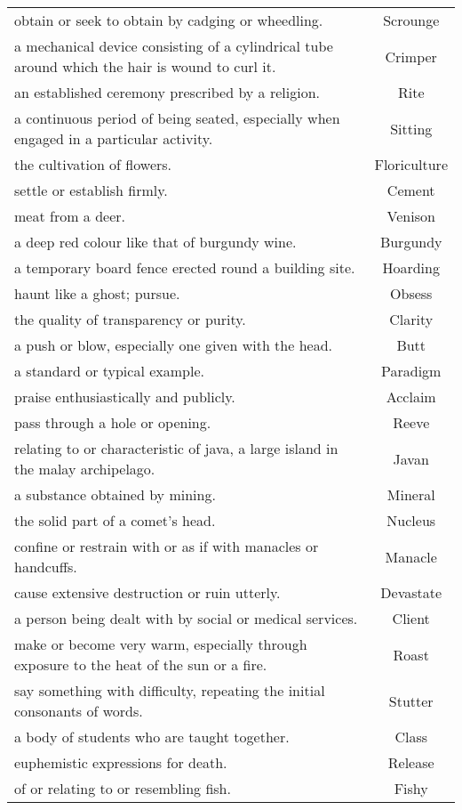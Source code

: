 \documentclass{article}
\begin{document}
\begin{longtable}{p{12cm}c}
obtain or seek to obtain by cadging or wheedling. & Scrounge\\
a mechanical device consisting of a cylindrical tube around which the hair is wound to curl it. & Crimper\\
an established ceremony prescribed by a religion. & Rite\\
a continuous period of being seated, especially when engaged in a particular activity. & Sitting\\
the cultivation of flowers. & Floriculture\\
settle or establish firmly. & Cement\\
meat from a deer. & Venison\\
a deep red colour like that of burgundy wine. & Burgundy\\
a temporary board fence erected round a building site. & Hoarding\\
haunt like a ghost; pursue. & Obsess\\
the quality of transparency or purity. & Clarity\\
a push or blow, especially one given with the head. & Butt\\
a standard or typical example. & Paradigm\\
praise enthusiastically and publicly. & Acclaim\\
pass through a hole or opening. & Reeve\\
relating to or characteristic of java, a large island in the malay archipelago. & Javan\\
a substance obtained by mining. & Mineral\\
the solid part of a comet's head. & Nucleus\\
confine or restrain with or as if with manacles or handcuffs. & Manacle\\
cause extensive destruction or ruin utterly. & Devastate\\
a person being dealt with by social or medical services. & Client\\
make or become very warm, especially through exposure to the heat of the sun or a fire. & Roast\\
say something with difficulty, repeating the initial consonants of words. & Stutter\\
a body of students who are taught together. & Class\\
euphemistic expressions for death. & Release\\
of or relating to or resembling fish. & Fishy\\

\end{longtable}
\end{document}
